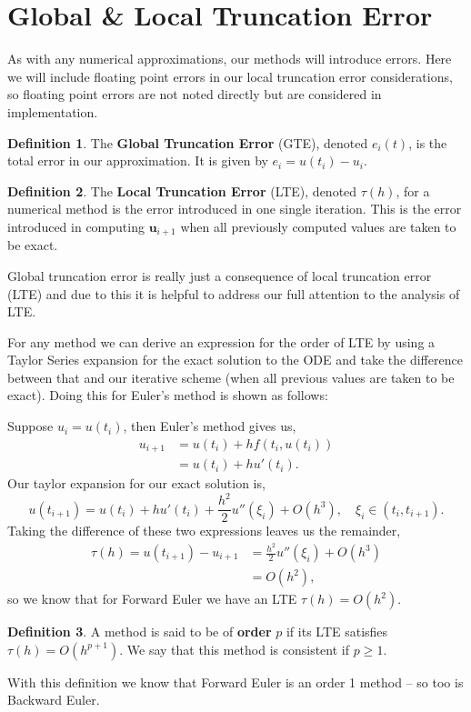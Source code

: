 \documentclass[12pt, twoside]{report}
\theoremstyle{plain}
\theoremstyle{definition}
\newtheorem{definition}{Definition}[chapter]
\begin{document}
    \section{Global \& Local Truncation Error}
    \label{2_error}
        As with any numerical approximations, our methods will introduce 
        errors. Here we will include floating point errors in our local truncation error considerations, so floating point errors are not noted directly but are considered in implementation.
        \begin{definition}
            The \textbf{Global Truncation Error} (GTE), denoted $e_{i}(t)$,
            is the total error in our approximation. It is given by 
            $e_i=u(t_i) - u_i$.
        \end{definition}
        \begin{definition}
            The \textbf{Local Truncation Error} (LTE), denoted $\tau (h)$,
            for a numerical method is the error introduced in one single 
            iteration. This is the error introduced in computing 
            $\mathbf{u}_{i+1}$ when all previously computed values are taken 
            to be exact.
        \end{definition}
        Global truncation error is really just a consequence of local 
        truncation error (LTE) and due to this it is helpful to address our 
        full attention to the analysis of LTE.
        
        For any method we can derive an expression for the order of LTE by 
        using a Taylor Series expansion for the exact solution to the ODE and
        take the difference between that and our iterative scheme (when all 
        previous values are taken to be exact). Doing this for Euler's method 
        is shown as follows:
        
        Suppose $u_i = u(t_i)$, then Euler's method gives us, 
        \begin{align}
            u_{i+1} &= u(t_i) + hf(t_i, u(t_i)) \\
            &= u(t_i) + hu'(t_i).
        \end{align}
        Our taylor expansion for our exact solution is,
        \begin{equation}
            u(t_{i+1}) = u(t_i) + hu'(t_i) + \frac{h^2}{2} u''(\xi_i) + O(h^3)
            , \quad \xi_i \in (t_i, t_{i+1}).
        \end{equation}
        Taking the difference of these two expressions leaves us the remainder,
        \begin{align}
            \tau(h) = u(t_{i+1}) - u_{i+1} &= \frac{h^2}{2} u''(\xi_i) + 
            O(h^3)\\&= O(h^2),
        \end{align}
        so we know that for Forward Euler we have an LTE $\tau(h)=O(h^2)$.
        \begin{definition}
            A method is said to be of \textbf{order} $p$ if its LTE satisfies 
            $\tau(h)=O(h^{p+1})$. We say that this method is consistent if $p 
            \ge 1$.
        \end{definition}
        With this definition we know that Forward Euler is an order 1 method 
        -- so too is Backward Euler.
\end{document}
